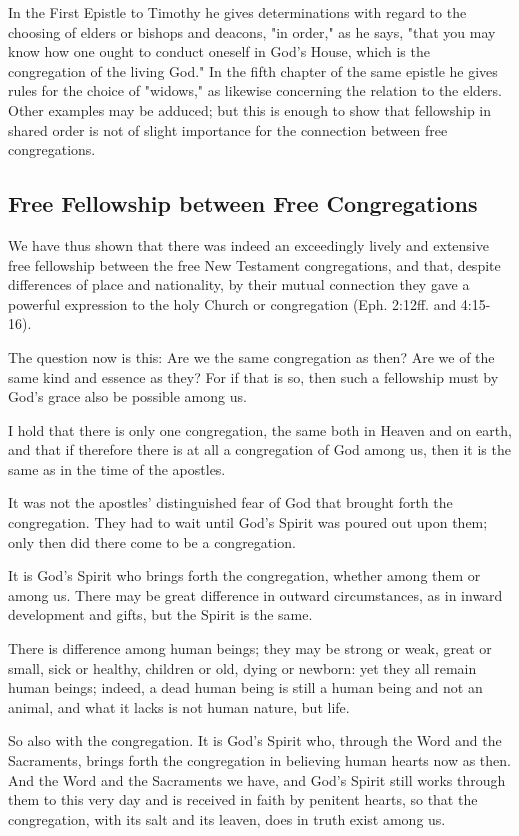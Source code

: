 In the First Epistle to Timothy he gives determinations with regard to the choosing of elders or bishops and deacons, "in order," as he says, "that you may know how one ought to conduct oneself in God's House, which is the congregation of the living God." In the fifth chapter of the same epistle he gives rules for the choice of "widows," as likewise concerning the relation to the elders. Other examples may be adduced; but this is enough to show that fellowship in shared order is not of slight importance for the connection between free congregations.

\subsection{Free Fellowship between Free Congregations}

We have thus shown that there was indeed an exceedingly lively and extensive free fellowship between the free New Testament congregations, and that, despite differences of place and nationality, by their mutual connection they gave a powerful expression to the holy Church or congregation (Eph. 2:12ff. and 4:15-16).

The question now is this:
Are we the same congregation as then? Are we of the same kind and essence as they? For if that is so, then such a fellowship must by God's grace also be possible among us.

I hold that there is only one congregation, the same both in Heaven and on earth, and that if therefore there is at all a congregation of God among us, then it is the same as in the time of the apostles.

It was not the apostles' distinguished fear of God that brought forth the congregation. They had to wait until God's Spirit was poured out upon them; only then did there come to be a congregation.

It is God's Spirit who brings forth the congregation, whether among them or among us. There may be great difference in outward circumstances, as in inward development and gifts, but the Spirit is the same.

There is difference among human beings; they may be strong or weak, great or small, sick or healthy, children or old, dying or newborn: yet they all remain human beings; indeed, a dead human being is still a human being and not an animal, and what it lacks is not human nature, but life.

So also with the congregation. It is God's Spirit who, through the Word and the Sacraments, brings forth the congregation in believing human hearts now as then. And the Word and the Sacraments we have, and God's Spirit still works through them to this very day and is received in faith by penitent hearts, so that the congregation, with its salt and its leaven, does in truth exist among us.

